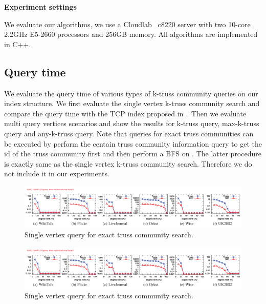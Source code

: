 \vskip 0.1in \noindent \textbf{Experiment settings} 

We evaluate our algorithms, we use a Cloudlab~\cite{RicciEide:login14} c8220 server with two 10-core 2.2GHz E5-2660 processors and 256GB memory. All algorithms are implemented in C++. 

\subsection{Query time}
\label{eval_query_time}

We evaluate the query time of various types of k-truss community queries on our index structure. We first evaluate the single vertex k-truss community search and compare the query time with the TCP index proposed in~\cite{huang2014querying}. Then we evaluate multi query vertices scenarios and show the results for k-truss query, max-k-truss query and any-k-truss query. Note that queries for exact truss communities can be executed by perform the centain truss community information query to get the id of the truss community first and then perform a BFS on \inducedgraph{}. The latter procedure is exactly same as the single vertex k-truss community search. Therefore we do not include it in our experiments.

\begin{figure}[ht]
    \centering
		\includegraphics[width=\linewidth]{./figures/example.png}
    \caption{Single vertex query for exact truss community search.}
    \label{fig:single_v_query_degree}
\end{figure}

\begin{figure}[ht]
    \centering
		\includegraphics[width=\linewidth]{./figures/example.png}
    \caption{Single vertex query for exact truss community search.}
    \label{fig:single_v_query_k}
\end{figure}

